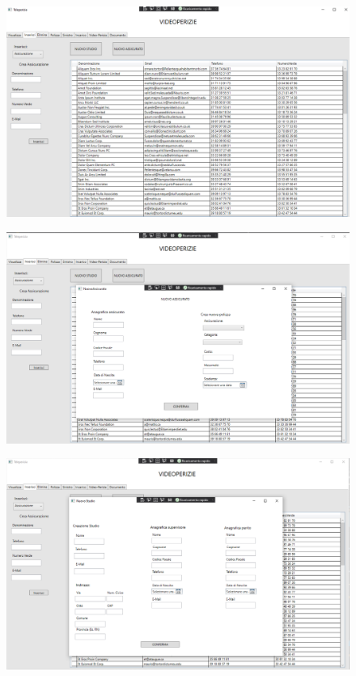 \documentclass[a4paper,12pt]{report}
\begin{document}
\begin{figure}[ht]
    \begin{center}
        \centering
        \includegraphics[width=\textwidth]{img/Applicazione/Inserisci1.png}
    \end{center}
\end{figure}
\clearpage
\begin{figure}[ht]
    \begin{center}
        \centering
        \includegraphics[width=\textwidth]{img/Applicazione/Inserisci2.png}
    \end{center}
\end{figure}
\clearpage
\begin{figure}[ht]
    \begin{center}
        \centering
        \includegraphics[width=\textwidth]{img/Applicazione/Inserisci3.png}
    \end{center}
\end{figure}
\clearpage
\end{document}
